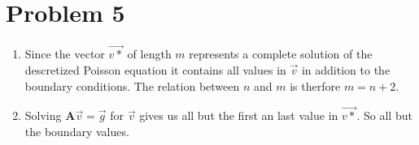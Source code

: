 \documentclass[english,notitlepage]{revtex4-1}  %
\begin{document}
\section*{Problem 5}

\begin{enumerate}[label= \alph*)]
  \item Since the vector $\vec{v*}$ of length $m$ represents a complete solution of the descretized Poisson equation it contains all values in $\vec{v}$ in addition to the boundary conditions. The relation between $n$ and $m$ is therfore $m=n+2$.
  \item Solving $\boldsymbol{A}\vec{v} = \vec{g}$ for $\vec{v}$ gives us all but the first an last value in $\vec{v*}$. So all but the boundary values.
\end{enumerate}
\end{document}
